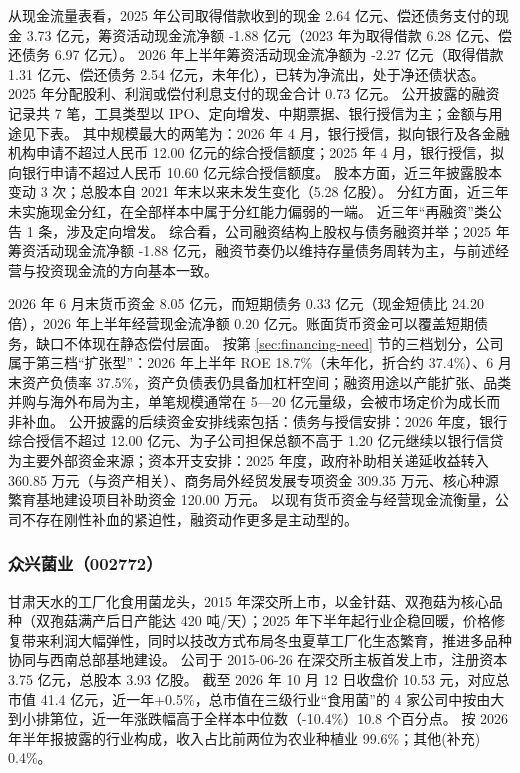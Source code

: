  从现金流量表看，2025 年公司取得借款收到的现金 2.64 亿元、偿还债务支付的现金 3.73 亿元，筹资活动现金流净额 -1.88 亿元（2023 年为取得借款 6.28 亿元、偿还债务 6.97 亿元）。 2026 年上半年筹资活动现金流净额为 -2.27 亿元（取得借款 1.31 亿元、偿还债务 2.54 亿元，未年化），已转为净流出，处于净还债状态。 2025 年分配股利、利润或偿付利息支付的现金合计 0.73 亿元。 公开披露的融资记录共 7 笔，工具类型以 IPO、定向增发、中期票据、银行授信为主；金额与用途见下表。 其中规模最大的两笔为：2026 年 4 月，银行授信，拟向银行及各金融机构申请不超过人民币 12.00 亿元的综合授信额度；2025 年 4 月，银行授信，拟向银行申请不超过人民币 10.60 亿元综合授信额度。 股本方面，近三年披露股本变动 3 次；总股本自 2021 年末以来未发生变化（5.28 亿股）。 分红方面，近三年未实施现金分红，在全部样本中属于分红能力偏弱的一端。 近三年“再融资”类公告 1 条，涉及定向增发。 综合看，公司融资结构上股权与债务融资并举；2025 年筹资活动现金流净额 -1.88 亿元，融资节奏仍以维持存量债务周转为主，与前述经营与投资现金流的方向基本一致。

 2026 年 6 月末货币资金 8.05 亿元，而短期债务 0.33 亿元（现金短债比 24.20 倍），2026 年上半年经营现金流净额 0.20 亿元。账面货币资金可以覆盖短期债务，缺口不体现在静态偿付层面。 按第 \ref{sec:financing-need} 节的三档划分，公司属于第三档“扩张型”：2026 年上半年 ROE 18.7\%（未年化，折合约 37.4\%）、6 月末资产负债率 37.5\%，资产负债表仍具备加杠杆空间；融资用途以产能扩张、品类并购与海外布局为主，单笔规模通常在 5---20 亿元量级，会被市场定价为成长而非补血。 公开披露的后续资金安排线索包括：债务与授信安排：2026 年度，银行综合授信不超过 12.00 亿元、为子公司担保总额不高于 1.20 亿元继续以银行信贷为主要外部资金来源；资本开支安排：2025 年度，政府补助相关递延收益转入 360.85 万元（与资产相关）、商务局外经贸发展专项资金 309.35 万元、核心种源繁育基地建设项目补助资金 120.00 万元。 以现有货币资金与经营现金流衡量，公司不存在刚性补血的紧迫性，融资动作更多是主动型的。




\subsubsection{众兴菌业（002772）}
\label{co:002772}

 甘肃天水的工厂化食用菌龙头，2015 年深交所上市，以金针菇、双孢菇为核心品种（双孢菇满产后日产能达 420 吨/天）；2025 年下半年起行业企稳回暖，价格修复带来利润大幅弹性，同时以技改方式布局冬虫夏草工厂化生态繁育，推进多品种协同与西南总部基地建设。 公司于 2015-06-26 在深交所主板首发上市，注册资本 3.75 亿元，总股本 3.93 亿股。 截至 2026 年 10 月 12 日收盘价 10.53 元，对应总市值 41.4 亿元，近一年+0.5\%，总市值在三级行业“食用菌”的 4 家公司中按由大到小排第位，近一年涨跌幅高于全样本中位数（-10.4\%）10.8 个百分点。 按 2026 年半年报披露的行业构成，收入占比前两位为农业种植业 99.6\%；其他(补充) 0.4\%。

